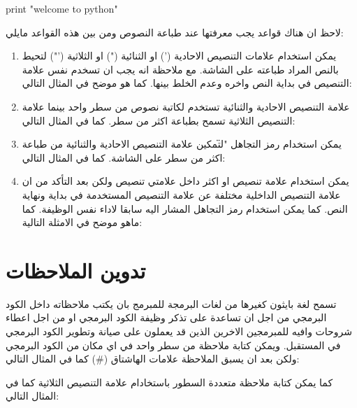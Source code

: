 print "welcome to python"

لاحظ ان هناك قواعد يجب معرفتها عند طباعة النصوص ومن بين هذه القواعد مايلي:
\begin{enumerate}
\item
يمكن استخدام علامات التنصيص الاحادية (’) او الثنائية (") او الثلاثية (’") لتحيط بالنص المراد طباعته على الشاشة. مع ملاحظة انه يجب ان تسخدم نفس علامة التنصيص في بداية النص واخره وعدم الخلط بينها. كما هو موضح في المثال التالي:

\item
علامة التنصيص الاحادية والثنائية تستخدم لكاتبة نصوص من سطر واحد بينما علامة التنصيص الثلاثية تسمح بطباعة اكثر من سطر. كما في المثال التالي:
\item
يمكن استخدام رمز التجاهل "\" لتمكين علامة التنصيص الاحادية والثنائية من طباعة اكثر من سطر على الشاشة. كما في المثال التالي:

\item
يمكن استخدام علامة تنصيص او اكثر داخل علامتي تنصيص ولكن بعد التأكد من ان علامة التنصيص الداخلية مختلفة عن علامة التنصيص المستخدمة في بداية ونهاية النص. كما يمكن استخدام رمز التجاهل المشار اليه سابقا لاداء نفس الوظيفة.  كما ماهو موضح في الامثلة التالية:

\end{enumerate}

\section{تدوين الملاحظات}
تسمح لغة بايثون كغيرها من لغات البرمجة للمبرمج بان يكتب ملاحظاته داخل الكود البرمجي من اجل ان تساعدة على تذكر وظيفة الكود البرمجي او من اجل اعطاء شروحات وافيه للمبرمجين الاخرين الذين قد يعملون على صيانة وتطوير الكود البرمجي في المستقبل. ويمكن كتابة ملاحظة من سطر واحد في اي مكان من الكود البرمجي ولكن بعد ان يسبق الملاحظة علامات الهاشتاق 
(\#)
كما في المثال التالي:
\begin{english}
\end{english}
كما يمكن كتابة ملاحظة متعددة السطور باستخادام علامة التنصيص الثلاثية كما في المثال التالي:
\begin{english}
\end{english}


